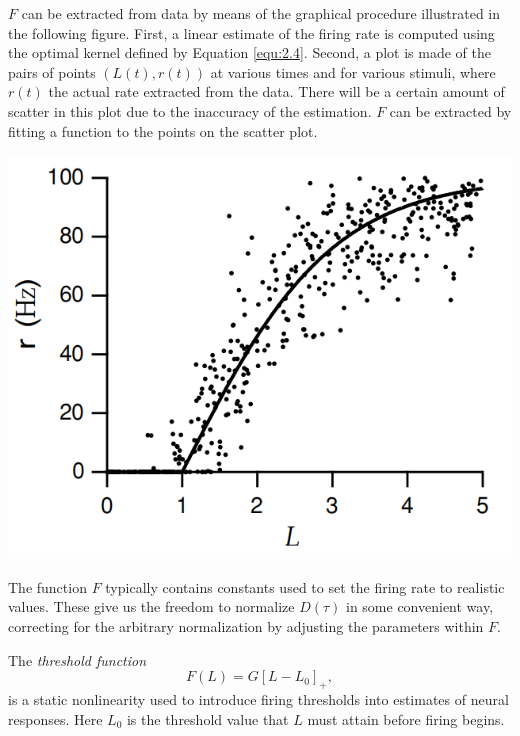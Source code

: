 \begin{exm}
  $F$ can be extracted from data by means of the graphical procedure illustrated in the following figure. First, a linear estimate of the firing rate is computed using the optimal kernel defined by Equation \ref{equ:2.4}. Second, a plot is made of the pairs of points $(L(t),r(t))$ at various times and for various stimuli, where $r(t)$ the actual rate extracted from the data. There will be a certain amount of scatter in this plot due to the inaccuracy of the estimation. $F$ can be extracted by fitting a function to the points on the scatter plot.
  \begin{center}
    \includegraphics[scale=0.3]{./png/staticNonlinearity}
  \end{center}
\end{exm}

\begin{rem}
  The function $F$ typically contains constants used to set the firing rate to realistic values. These give us the freedom to normalize $D(\tau)$ in some convenient way, correcting for the arbitrary normalization by adjusting the parameters within $F$.
\end{rem}

\begin{exm}
  \label{thresholdFunction}
  The \emph{threshold function}
  \begin{equation}
    \label{equ:2.9}
    F(L) = G[L-L_0]_+,
  \end{equation}
  is a static nonlinearity used to introduce firing thresholds into estimates of neural responses. Here $L_0$ is the threshold value that $L$ must attain before firing begins.
\end{exm}


